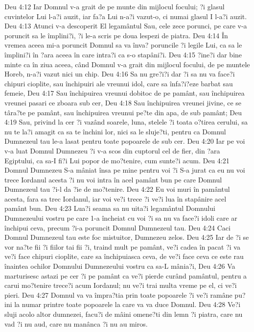 Deu 4:12  Iar Domnul v-a grait de pe munte din mijlocul focului; ?i glasul cuvintelor Lui l-a?i auzit, iar fa?a Lui n-a?i vazut-o, ci numai glasul I l-a?i auzit.
Deu 4:13  Atunci v-a descoperit El legamântul Sau, cele zece porunci, pe care v-a poruncit sa le împlini?i, ?i le-a scris pe doua lespezi de piatra.
Deu 4:14  În vremea aceea mi-a poruncit Domnul sa va înva? poruncile ?i legile Lui, ca sa le împlini?i în ?ara aceea în care intra?i ca s-o stapâni?i.
Deu 4:15  ?ine?i dar bine minte ca în ziua aceea, când Domnul v-a grait din mijlocul focului, de pe muntele Horeb, n-a?i vazut nici un chip.
Deu 4:16  Sa nu gre?i?i dar ?i sa nu va face?i chipuri cioplite, sau închipuiri ale vreunui idol, care sa înfa?i?eze barbat sau femeie,
Deu 4:17  Sau închipuirea vreunui dobitoc de pe pamânt, sau închipuirea vreunei pasari ce zboara sub cer,
Deu 4:18  Sau închipuirea vreunei jivine, ce se târa?te pe pamânt, sau închipuirea vreunui pe?te din apa, de sub pamânt;
Deu 4:19  Sau, privind la cer ?i vazând soarele, luna, stelele ?i toata o?tirea cerului, sa nu te la?i amagit ca sa te închini lor, nici sa le sluje?ti, pentru ca Domnul Dumnezeul tau le-a lasat pentru toate popoarele de sub cer.
Deu 4:20  Iar pe voi v-a luat Domnul Dumnezeu ?i v-a scos din cuptorul cel de fier, din ?ara Egiptului, ca sa-I fi?i Lui popor de mo?tenire, cum sunte?i acum.
Deu 4:21  Domnul Dumnezeu S-a mâniat însa pe mine pentru voi ?i S-a jurat ca eu nu voi trece Iordanul acesta ?i nu voi intra în acel pamânt bun pe care Domnul Dumnezeul tau ?i-l da ?ie de mo?tenire.
Deu 4:22  Eu voi muri în pamântul acesta, fara sa trec Iordanul, iar voi ve?i trece ?i ve?i lua în stapânire acel pamânt bun.
Deu 4:23  Lua?i seama sa nu uita?i legamântul Domnului Dumnezeului vostru pe care 1-a încheiat cu voi ?i sa nu va face?i idoli care ar închipui ceva, precum ?i-a poruncit Domnul Dumnezeul tau.
Deu 4:24  Caci Domnul Dumnezeul tau este foc mistuitor, Dumnezeu zelos.
Deu 4:25  Iar de ?i se vor na?te fii ?i fiilor tai fii ?i, traind mult pe pamânt, ve?i cadea în pacat ?i va ve?i face chipuri cioplite, care sa închipuiasca ceva, de ve?i face ceva ce este rau înaintea ochilor Domnului Dumnezeului vostru ca sa-L mânia?i,
Deu 4:26  Va marturisesc astazi pe cer ?i pe pamânt ca ve?i pierde curând pamântul, pentru a carui mo?tenire trece?i acum Iordanul; nu ve?i trai multa vreme pe el, ci ve?i pieri.
Deu 4:27  Domnul va va împra?tia prin toate popoarele ?i ve?i ramâne pu?ini la numar printre toate popoarele la care va va duce Domnul.
Deu 4:28  Ve?i sluji acolo altor dumnezei, facu?i de mâini omene?ti din lemn ?i piatra, care nu vad ?i nu aud, care nu manânca ?i nu au miros.

